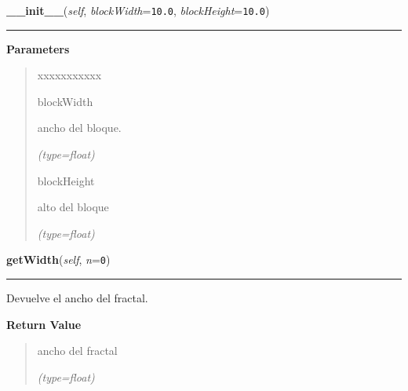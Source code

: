 \hspace{.8\funcindent}\begin{boxedminipage}{\funcwidth}

    \raggedright \textbf{\_\_init\_\_}(\textit{self}, \textit{blockWidth}={\tt 10.0}, \textit{blockHeight}={\tt 10.0})

    \vspace{-1.5ex}

    \rule{\textwidth}{0.5\fboxrule}
\setlength{\parskip}{2ex}
\setlength{\parskip}{1ex}
      \textbf{Parameters}
      \vspace{-1ex}

      \begin{quote}
        \begin{Ventry}{xxxxxxxxxxx}

          \item[blockWidth]

          ancho del bloque.

            {\it (type=float)}

          \item[blockHeight]

          alto del bloque

            {\it (type=float)}

        \end{Ventry}

      \end{quote}

    \end{boxedminipage}

    \label{FractalZE:pascal:Pascal:getWidth}

    \vspace{0.5ex}

\hspace{.8\funcindent}\begin{boxedminipage}{\funcwidth}

    \raggedright \textbf{getWidth}(\textit{self}, \textit{n}={\tt 0})

    \vspace{-1.5ex}

    \rule{\textwidth}{0.5\fboxrule}
\setlength{\parskip}{2ex}
    Devuelve el ancho del fractal.

\setlength{\parskip}{1ex}
      \textbf{Return Value}
    \vspace{-1ex}

      \begin{quote}
      ancho del fractal

      {\it (type=float)}

      \end{quote}

    \end{boxedminipage}

